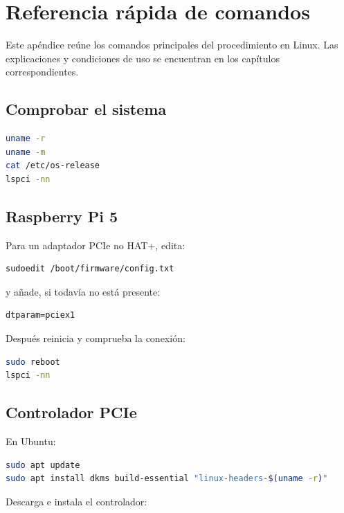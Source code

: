 \chapter{Referencia rápida de comandos}
\label{app:comandos}
\lstset{aboveskip=0.35em,belowskip=0.4em}

Este apéndice reúne los comandos principales del procedimiento en Linux.
Las explicaciones y condiciones de uso se encuentran en los capítulos correspondientes.

\section{Comprobar el sistema}

\begin{lstlisting}[language=bash]
uname -r
uname -m
cat /etc/os-release
lspci -nn
\end{lstlisting}

\section{Raspberry Pi 5}

Para un adaptador PCIe no HAT+, edita:

\begin{lstlisting}[language=bash]
sudoedit /boot/firmware/config.txt
\end{lstlisting}

y añade, si todavía no está presente:

\begin{lstlisting}
dtparam=pciex1
\end{lstlisting}

Después reinicia y comprueba la conexión:

\begin{lstlisting}[language=bash]
sudo reboot
lspci -nn
\end{lstlisting}

\section{Controlador PCIe}

En Ubuntu:

\begin{lstlisting}[language=bash]
sudo apt update
sudo apt install dkms build-essential "linux-headers-$(uname -r)"
\end{lstlisting}

Descarga e instala el controlador:

